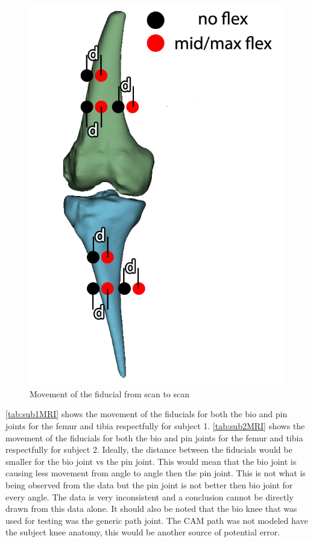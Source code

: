 \begin{figure}
    \centering
    \includegraphics[scale=0.5]{images/mech_design/front view_edit.png}
    \caption{Movement of the fiducial from scan to scan}
    \label{fig:fiducialMovement}
\end{figure}


\autoref{tab:sub1MRI} shows the movement of the fiducials for both the bio and pin joints for the femur and tibia respectfully for subject 1. \autoref{tab:sub2MRI} shows the movement of the fiducials for both the bio and pin joints for the femur and tibia respectfully for subject 2. Ideally, the distance between the fiducials would be smaller for the bio joint vs the pin joint. This would mean that the bio joint is causing less movement from angle to angle then the pin joint. This is not what is being observed from the data but the pin joint is not better then bio joint for every angle. The data is very inconsistent and a conclusion cannot be directly drawn from this data alone. It should also be noted that the bio knee that was used for testing was the generic path joint. The CAM path was not modeled have the subject knee anatomy, this would be another source of potential error.   


